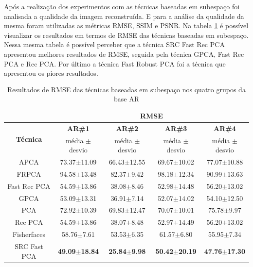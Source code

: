 Após a realização dos experimentos com as técnicas baseadas em subespaço foi analisada a qualidade da imagem reconstruída. E para a análise da qualidade da mesma foram utilizadas as métricas RMSE, SSIM e PSNR. Na tabela \ref{tab:RMSE_subespaco} é possível visualizar os resultados em termos de RMSE das técnicas baseadas em subespaço. Nessa mesma tabela é possível perceber que a técnica SRC Fast Rec PCA apresentou melhores resultados de RMSE, seguida pela técnica GPCA, Fast Rec PCA e Rec PCA. Por último a técnica Fast Robust PCA foi a técnica que apresentou os piores resultados.


\begin{table}[H]
\caption{Resultados de RMSE das técnicas baseadas em subespaço nos quatro grupos da base AR}
\centering
\begin{tabular}{|c|c|c|c|c|}
\cline{2-5}
 \multicolumn{1}{c|}{} & \multicolumn{4}{c|}{\textbf{RMSE}}\\ \hline
\multicolumn{1}{|c|}{\multirow{2}{*}{\textbf{Técnica} }}& \textbf{AR\#1} &  \textbf{AR\#2} & \textbf{AR\#3} & \textbf{AR\#4 }  \\ \cline{2-5}

& média $\pm$ desvio & média $\pm$ desvio & média $\pm$ desvio & média $\pm$ desvio \\\hline 
APCA			&73.37$\pm$11.09 &	66.43$\pm$12.55  &69.67$\pm$10.02	&77.07$\pm$10.88 \\\hline
FRPCA			&94.58$\pm$13.48 &	82.37$\pm$9.42	 &98.18$\pm$12.34	&90.99$\pm$13.63 \\\hline
Fast Rec PCA	&54.59$\pm$13.86 &	38.08$\pm$8.46	 &52.98$\pm$14.48	&56.20$\pm$13.02 \\\hline
GPCA			&53.09$\pm$13.31 &	36.91$\pm$7.14	 &52.07$\pm$14.02	&54.10$\pm$12.50 \\\hline
PCA				&72.92$\pm$10.39 &	69.83$\pm$12.47  &70.07$\pm$10.01	&75.78$\pm$9.97 \\\hline
Rec PCA			&54.59$\pm$13.86 &	38.07$\pm$8.48	 &52.97$\pm$14.49	&56.20$\pm$13.02\\\hline
Fisherfaces		&58.76$\pm$7.61  &	53.53$\pm$6.35	 &61.57$\pm$6.80	&55.95$\pm$7.34\\\hline
SRC Fast PCA    &\textbf{49.09$\pm$18.84} &	\textbf{25.84$\pm$9.98}	 &\textbf{50.42$\pm$20.19}	&\textbf{47.76$\pm$17.30} \\\hline


\end{tabular}
\label{tab:RMSE_subespaco}
\end{table}



